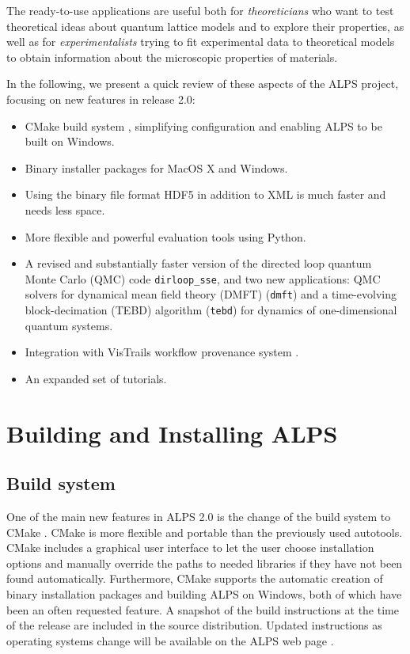 \documentclass[12pt]{iopart}
\begin{document}
The ready-to-use applications are useful both for 
{\it theoreticians} who want to test theoretical ideas about quantum
lattice models and to explore their properties, as well as for 
{\it experimentalists} trying to fit experimental data to theoretical
models to obtain information about the microscopic properties of
materials.

 In the following, we present a quick review of these
 aspects of the ALPS project, focusing on new features in release 2.0:
 
 \begin{itemize}
\item CMake build system \cite{cmake}, simplifying configuration and enabling ALPS to be built on  Windows.
\item Binary installer packages for MacOS X and Windows.
\item Using the binary file format HDF5 \cite{hdf5} in addition to XML is much faster and needs less space.
\item More flexible and powerful evaluation tools using Python.
\item A revised and substantially faster version of the directed loop quantum Monte Carlo (QMC) code {\tt dirloop\_sse}, and two new applications: QMC solvers for dynamical mean field theory (DMFT) ({\tt dmft}) and a time-evolving block-decimation (TEBD) algorithm ({\tt tebd}) for dynamics of one-dimensional quantum systems.
\item Integration with VisTrails workflow provenance system \cite{vistrails}.
\item An expanded set of tutorials.
 \end{itemize}
 
 
\section{Building and Installing ALPS}
\subsection{Build system}
One of the main new features in ALPS 2.0 is the change of the build system to CMake \cite{cmake}. CMake is more flexible and portable than the previously used autotools. CMake includes a graphical user interface to let the user choose installation options and manually override the paths to needed libraries if they have not been found automatically. Furthermore,  CMake supports the automatic creation of binary installation packages and building ALPS on Windows, both of which have been an often requested feature. A snapshot of the build instructions at the time of the release are included in the source distribution. Updated instructions as operating systems change will be available on the ALPS web page \cite{alps}.
\end{document}
